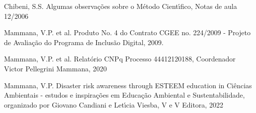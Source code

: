 \documentclass[
12pt,		%
openright,	%
twoside,  %
a4paper,			%
chapter=TITLE,		%
english,			%
french,				%
spanish,			%
brazil				%
]{USPSC-classe/USPSC}
\begin{document}
\begin{flushleft}
\begin{flushleft}
\begin{flushleft}
\begin{flushleft}
[CHIBENI, 2006] Chibeni, S.S. Algumas observa\c{c}\~oes sobre o M\'etodo Cient\'{\i}fico, Notas de aula 12/2006
\end{flushleft}


\end{flushleft}


\end{flushleft}


\end{flushleft}


\begin{flushleft}
\begin{flushleft}
\begin{flushleft}
\begin{flushleft}
[CGEE, 2010a] Mammana, V.P. et al. Produto No. 4 do Contrato CGEE no. 224/2009 - Projeto de Avalia\c{c}\~ao do Programa de Inclus\~ao Digital, 2009.
\end{flushleft}


\end{flushleft}


\end{flushleft}


\end{flushleft}


\begin{flushleft}
\begin{flushleft}
\begin{flushleft}
\begin{flushleft}
[MAMMANA et al., 2020a] Mammana, V.P. et al. Relat\'orio CNPq Processo 44412120188, Coordenador Victor Pellegrini Mammana, 2020
\end{flushleft}


\end{flushleft}


\end{flushleft}


\end{flushleft}


\begin{flushleft}
\begin{flushleft}
\begin{flushleft}
\begin{flushleft}
[MAMMANA et al., 2022a] Mammana, V.P. Disaster risk awareness through ESTEEM education in Ci\^encias Ambientais - estudos e inspira\c{c}\~oes em Educa\c{c}\~ao Ambiental e Sustentabilidade, organizado por Giovano Candiani e Let\'{\i}cia Viesba, V e V Editora, 2022
\end{flushleft}


\end{flushleft}


\end{flushleft}


\end{flushleft}
\end{document}
